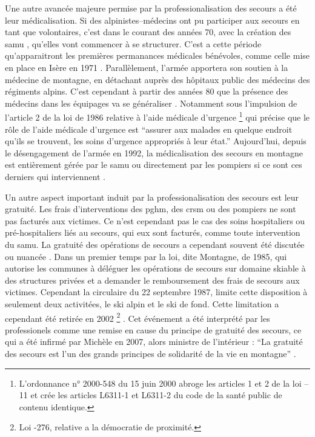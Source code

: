 Une autre avancée majeure permise par la professionalisation des
secours a été leur médicalisation. Si des alpinistes--médecins ont pu
participer aux secours en tant que volontaires, c'est dans le courant
des années 70, avec la création des \ac{samu} \autocite{Halle2007},
qu'elles vont commencer à se structurer. C'est a cette période
qu’apparaitront les premières permanances médicales bénévoles, comme
celle mise en place en Isère en 1971
\autocite{Rocourt2014}. Parallèlement, l'armée apportera son soutien à
la médecine de montagne, en détachant auprès des hôpitaux public des
médecins des régiments alpins. C'est cependant à partir des années 80
que la présence des médecins dans les équipages va se généraliser
\autocite{CFDLD}. Notamment sous l'impulsion de l'article 2 de la loi
de 1986 relative à l'aide médicale d'urgence \footnote{L’ordonnance n°
  2000-548 du 15 juin 2000 abroge les articles 1 et 2 de la loi --11 et crée les articles L6311-1 et L6311-2 du code de la santé
  public de contenu identique.}  \autocite{Rocourt2014} qui précise
que le rôle de l'aide médicale d'urgence est
\enquote{assurer aux malades \textelp{} en quelque endroit
  qu'ils se trouvent, les soins d'urgence appropriés à leur état.}
Aujourd'hui, depuis le désengagement de l'armée en 1992, la
médicalisation des secours en montagne est entièrement gérée par le
\ac{samu} ou directement par les pompiers si ce sont ces derniers qui
interviennent \autocite{Rocourt2014, Halle2007}.

Un autre aspect important induit par la professionalisation des
secours est leur gratuité. Les frais d'interventions des \ac{pghm},
des \ac{crsm} ou des pompiers ne sont pas facturés aux victimes. Ce
n'est cependant pas le cas des soins hospitaliers ou pré-hospitaliers
liés au secours, qui eux sont facturés, comme toute intervention du
\ac{samu}. La gratuité des opérations de secours a cependant souvent
été discutée ou nuancée \autocite{CFDLD, Halle2007, Magne2017}. Dans
un premier temps par la loi, dite Montagne, de 1985, qui autorise les
communes à déléguer les opérations de secours sur domaine skiable à
des structures privées et a demander le remboursement des frais de
secours aux victimes. Cependant la circulaire du 22 septembre 1987,
limite cette disposition à seulement deux activitées, le ski alpin et
le ski de fond. Cette limitation a cependant été retirée en 2002
\footnote{Loi -276, relative a la démocratie de proximité.}
\autocite{Magne2017}. Cet événement a été interprété par les
professionels comme une remise en cause du principe de gratuité des
secours, ce qui a été infirmé par Michèle  en 2007,
alors ministre de l'intérieur : \enquote{La gratuité des secours est
  l’un des grands principes de solidarité de la vie en montagne}
\autocite{CFDLD}.

